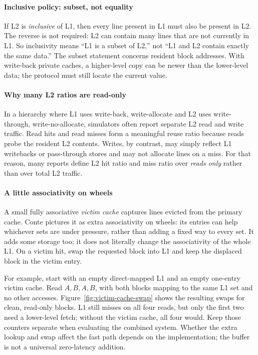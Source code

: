 \paragraph{Inclusive policy: subset, not equality}\label{par:auto-021f}
If L2 is \textit{inclusive} of L1, then every line present in L1 must also be present in L2.
The reverse is not required: L2 can contain many lines that are not currently in L1.
So inclusivity means ``L1 is a subset of L2,'' not ``L1 and L2 contain exactly the same data.''
The subset statement concerns resident block addresses.
With write-back private caches, a higher-level copy can be newer than the lower-level data; the protocol must still locate the current value.

\paragraph{Why many L2 ratios are read-only}\label{par:auto-021d}
In a hierarchy where L1 uses write-back, write-allocate and L2 uses write-through, write-no-allocate, simulators often report separate L2 read and write traffic.
Read hits and read misses form a meaningful reuse ratio because reads probe the resident L2 contents.
Writes, by contrast, may simply reflect L1 writebacks or pass-through stores and may not allocate lines on a miss.
For that reason, many reports define L2 hit ratio and miss ratio over \textit{reads only} rather than over total L2 traffic.

\paragraph{A little associativity on wheels}
A small fully associative \textit{victim cache} captures lines evicted from the primary cache.
Conte pictures it as extra associativity on wheels: its entries can help whichever sets are under pressure, rather than adding a fixed way to every set.
It adds some storage too; it does not literally change the associativity of the whole L1.
On a victim hit, swap the requested block into L1 and keep the displaced block in the victim entry.

For example, start with an empty direct-mapped L1 and an empty one-entry victim cache.
Read $A,B,A,B$, with both blocks mapping to the same L1 set and no other accesses.
Figure~\ref{fig:victim-cache-swap} shows the resulting swaps for clean, read-only blocks.
L1 still misses on all four reads, but only the first two need a lower-level fetch; without the victim cache, all four would.
Keep those counters separate when evaluating the combined system.
Whether the extra lookup and swap affect the fast path depends on the implementation; the buffer is not a universal zero-latency addition.

